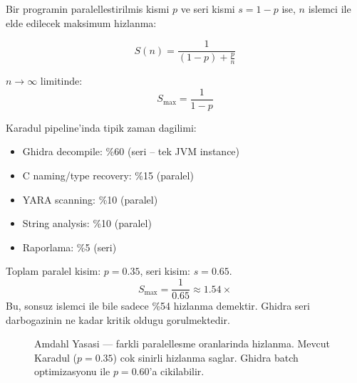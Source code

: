 Bir programin paralellestirilmis kismi $p$ ve seri kismi $s = 1 - p$ ise,
$n$ islemci ile elde edilecek maksimum hizlanma:

\begin{equation}
  S(n) = \frac{1}{(1 - p) + \frac{p}{n}}
  \label{eq:amdahl}
\end{equation}

$n \to \infty$ limitinde:
\begin{equation}
  S_{\max} = \frac{1}{1 - p}
  \label{eq:amdahl-limit}
\end{equation}

\begin{example}
Karadul pipeline'inda tipik zaman dagili\-mi:
\begin{itemize}
  \item Ghidra decompile: \%60 (seri -- tek JVM instance)
  \item C naming/type recovery: \%15 (paralel)
  \item YARA scanning: \%10 (paralel)
  \item String analysis: \%10 (paralel)
  \item Raporlama: \%5 (seri)
\end{itemize}
Toplam paralel kisim: $p = 0.35$, seri kisim: $s = 0.65$.
\begin{equation}
  S_{\max} = \frac{1}{0.65} \approx 1.54 \times
\end{equation}
Bu, sonsuz islemci ile bile sadece \%54 hizlanma demektir.
Ghidra seri darbogazinin ne kadar kritik oldugu gorulmektedir.
\end{example}

\begin{figure}[htbp]
\centering
{}
\caption{Amdahl Yasasi --- farkli paralellesme oranlarinda hizlanma.
Mevcut Karadul ($p=0.35$) cok sinirli hizlanma saglar.
Ghidra batch optimizasyonu ile $p=0.60$'a cikilabilir.}
\label{fig:amdahl-curves}
\end{figure}


